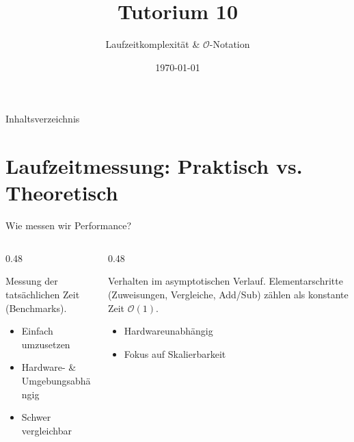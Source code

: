 \documentclass[aspectratio=169,11pt]{beamer}
\title{\textbf{Tutorium 10}}
\subtitle{Laufzeitkomplexität \& \texorpdfstring{$\mathcal{O}$}{O}-Notation}
\institute{Grundlagen der Praktischen Informatik}
\author{}
\date{\today}
\begin{document}
\begin{frame}[plain]
    \titlepage
\end{frame}


\begin{frame}{Inhaltsverzeichnis}
    \tableofcontents
\end{frame}


\section{Laufzeitmessung: Praktisch vs. Theoretisch}

\begin{frame}{Wie messen wir Performance?}
    \begin{columns}[T]
        \begin{column}{0.48\textwidth}
            \begin{tcolorbox}[modernbox, title=Praktische Messung]
                Messung der tatsächlichen Zeit (Benchmarks).
                \begin{itemize}
                    \item[\textcolor{Success}{\faPlus}] Einfach umzusetzen
                    \item[\textcolor{Accent}{\faMinus}] Hardware- \& Umgebungsabhängig
                    \item[\textcolor{Accent}{\faMinus}] Schwer vergleichbar
                \end{itemize}
            \end{tcolorbox}
        \end{column}
        \begin{column}{0.48\textwidth}
            \begin{tcolorbox}[modernbox, title=Theoretische Analyse]
                Verhalten im asymptotischen Verlauf. Elementarschritte (Zuweisungen, Vergleiche, Add/Sub) zählen als konstante Zeit $\mathcal{O}(1)$.
                \begin{itemize}
                    \item[\textcolor{Success}{\faPlus}] Hardwareunabhängig
                    \item[\textcolor{Success}{\faPlus}] Fokus auf Skalierbarkeit
                \end{itemize}
            \end{tcolorbox}
        \end{column}
    \end{columns}
\end{frame}
\end{document}
